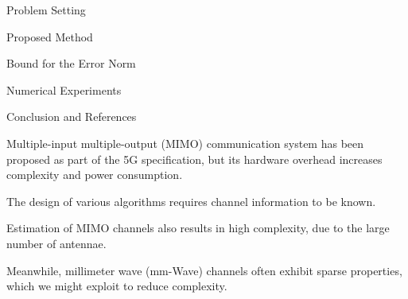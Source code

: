 

\Title {\TitleText}
\blank [big]

\Subtitle {\AuthorText}
\blank [big]

\Subsubtitle {\DateText}

\page [yes]
{
\I Problem Setting

\I Proposed Method

\I Bound for the Error Norm

\I Numerical Experiments

\I Conclusion and References
}
{
\I Multiple-input multiple-output (MIMO) communication system has been proposed as part of the 5G specification, but its hardware overhead increases complexity and power consumption.

\I The design of various algorithms requires channel information to be known.

\I Estimation of MIMO channels also results in high complexity, due to the large number of antennae.

\I Meanwhile, millimeter wave (mm-Wave) channels often exhibit sparse properties, which we might exploit to reduce complexity.
}

